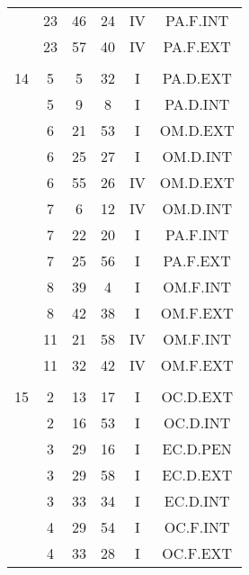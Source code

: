 \documentclass[12pt, a4paper]{article}
\begin{document}
\begin{multicols}{3}
{\begin{tabular}{c c c c c c}
	 	 	 	 & 23 & 46 & 24 & IV & PA.F.INT\\%
	 	 	 	 & 23 & 57 & 40 & IV & PA.F.EXT\\%
	 	 	 	 & & & & & \\%
	 	 	 	14 & 5 & 5 & 32 & I & PA.D.EXT\\%
	 	 	 	 & 5 & 9 & 8 & I & PA.D.INT\\%
	 	 	 	 & 6 & 21 & 53 & I & OM.D.EXT\\%
	 	 	 	 & 6 & 25 & 27 & I & OM.D.INT\\%
	 	 	 	 & 6 & 55 & 26 & IV & OM.D.EXT\\%
	 	 	 	 & 7 & 6 & 12 & IV & OM.D.INT\\%
	 	 	 	 & 7 & 22 & 20 & I & PA.F.INT\\%
	 	 	 	 & 7 & 25 & 56 & I & PA.F.EXT\\%
	 	 	 	 & 8 & 39 & 4 & I & OM.F.INT\\%
	 	 	 	 & 8 & 42 & 38 & I & OM.F.EXT\\%
	 	 	 	 & 11 & 21 & 58 & IV & OM.F.INT\\%
	 	 	 	 & 11 & 32 & 42 & IV & OM.F.EXT\\%
	 	 	 	 & & & & & \\%
	 	 	 	15 & 2 & 13 & 17 & I & OC.D.EXT\\%
	 	 	 	 & 2 & 16 & 53 & I & OC.D.INT\\%
	 	 	 	 & 3 & 29 & 16 & I & EC.D.PEN\\%
	 	 	 	 & 3 & 29 & 58 & I & EC.D.EXT\\%
	 	 	 	 & 3 & 33 & 34 & I & EC.D.INT\\%
	 	 	 	 & 4 & 29 & 54 & I & OC.F.INT\\%
	 	 	 	 & 4 & 33 & 28 & I & OC.F.EXT\\%

\end{tabular}}
\end{multicols}
\end{document}
